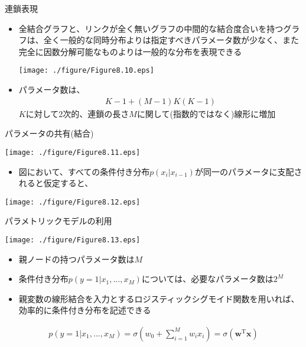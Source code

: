  \begin{frame}{連鎖表現}
  \begin{itemize}
   \item 全結合グラフと、リンクが全く無いグラフの中間的な結合度合いを持つグラフは、全く一般的な同時分布よりは指定すべきパラメータ数が少なく、また完全に因数分解可能なものよりは一般的な分布を表現できる
         \begin{center}
          \texttt{[image: ./figure/Figure8.10.eps]}
         \end{center}

   \item パラメータ数は、
         \begin{eqnarray*}
          K - 1 + (M-1)K(K-1)
         \end{eqnarray*}
         $K$に対して2次的、連鎖の長さ$M$に関して(指数的ではなく)線形に増加
  \end{itemize}
 \end{frame}

 \begin{frame}{パラメータの共有(結合)}
  \begin{center}
   \texttt{[image: ./figure/Figure8.11.eps]}
  \end{center}
  \begin{itemize}
   \item 図において、すべての条件付き分布$p(x_i|x_{i-1})$が同一のパラメータに支配されると仮定すると、
  \end{itemize}
  \begin{center}
   \texttt{[image: ./figure/Figure8.12.eps]}
  \end{center}
 \end{frame}

 \begin{frame}{パラメトリックモデルの利用}
  \begin{center}
   \texttt{[image: ./figure/Figure8.13.eps]}
  \end{center}
  \begin{itemize}
   \item 親ノードの持つパラメータ数は$M$
   \item 条件付き分布$p(y=1|x_1,...,x_M)$については、必要なパラメータ数は$2^M$
   \item 親変数の線形結合を入力とするロジスティックシグモイド関数を用いれば、効率的に条件付き分布を記述できる
  \end{itemize}
  \begin{eqnarray*}
   p(y=1|x_1,...,x_M) = \sigma \left( w_0 + \sum_{i=1}^{M}w_ix_i\right) = \sigma (\bm{w}^{\mathrm{T}}\bm{x})
  \end{eqnarray*}
 \end{frame}

